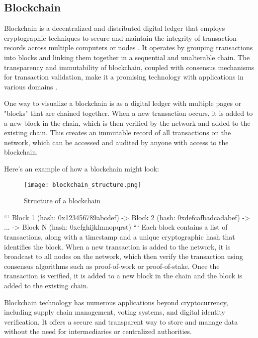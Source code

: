 \subsection{Blockchain}
Blockchain is a decentralized and distributed digital ledger that employs cryptographic techniques to secure and maintain the integrity of transaction records across multiple computers or nodes \cite{nakamoto2008bitcoin}. It operates by grouping transactions into blocks and linking them together in a sequential and unalterable chain. The transparency and immutability of blockchain, coupled with consensus mechanisms for transaction validation, make it a promising technology with applications in various domains \cite{swan2015blockchain}.

One way to visualize a blockchain is as a digital ledger with multiple pages or "blocks" that are chained together. When a new transaction occurs, it is added to a new block in the chain, which is then verified by the network and added to the existing chain. This creates an immutable record of all transactions on the network, which can be accessed and audited by anyone with access to the blockchain.

Here's an example of how a blockchain might look:

\begin{figure}[h]
    \centering
    \texttt{[image: blockchain\_structure.png]}
    \caption{Structure of a blockchain \cite{nakamoto2008bitcoin}}
    \label{fig:blockchain}
\end{figure}

```
Block 1 (hash: 0x123456789abcdef) -> Block 2 (hash: 0xdefcafbadcadabef) -> ... -> Block N (hash: 0xefghijklmnopqrst)
```
Each block contains a list of transactions, along with a timestamp and a unique cryptographic hash that identifies the block. When a new transaction is added to the network, it is broadcast to all nodes on the network, which then verify the transaction using consensus algorithms such as proof-of-work or proof-of-stake. Once the transaction is verified, it is added to a new block in the chain and the block is added to the existing chain.

Blockchain technology has numerous applications beyond cryptocurrency, including supply chain management, voting systems, and digital identity verification. It offers a secure and transparent way to store and manage data without the need for intermediaries or centralized authorities.
